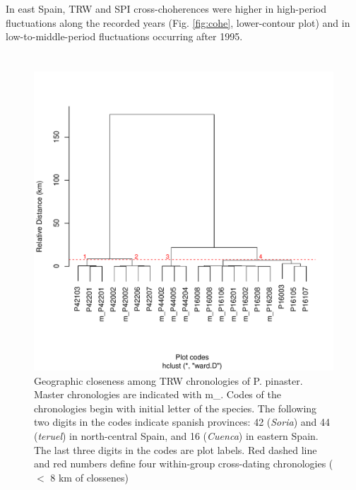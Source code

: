 \documentclass[review,authoryear]{elsarticle}
\begin{document}
In east Spain, \gls{TRW} and \gls{SPI} cross-choherences were higher
in high-period fluctuations along the recorded years
(Fig. \ref{fig:cohe}, lower-contour plot) and in low-to-middle-period
fluctuations occurring after 1995.



\newpage
\section{\refname}



\clearpage
\begin{figure}\centering
\includegraphics[scale=0.8,trim=20mm 0mm 20mm 0mm]{clust} 
\caption{Geographic closeness among \acrfull{TRW} chronologies of
  \gls{P. pinaster}. Master chronologies are indicated with m\_. Codes
  of the chronologies begin with initial letter of the species. The
  following two digits in the codes indicate spanish provinces: 42
  (\textit{Soria}) and 44 (\textit{teruel}) in north-central Spain,
  and 16 (\textit{Cuenca}) in eastern Spain. The last three digits in
  the codes are plot labels. Red dashed line and red numbers define
  four within-group cross-dating chronologies ($<$ 8 km of clossenes)}
\label{fig:clust} 
\end{figure}
\end{document}
